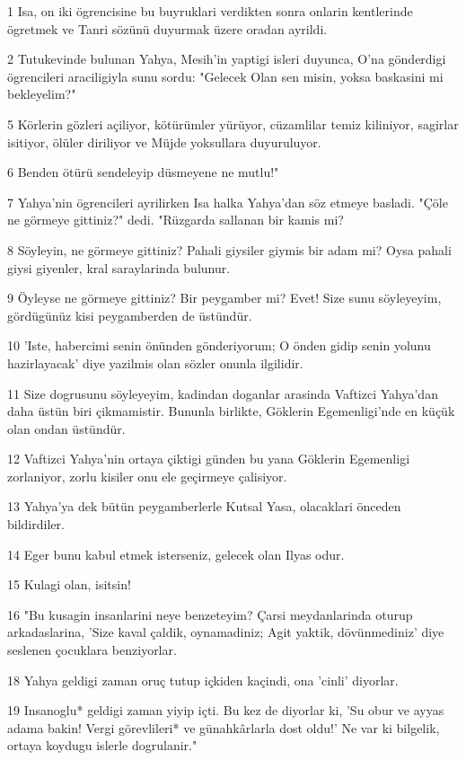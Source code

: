 \par 1 Isa, on iki ögrencisine bu buyruklari verdikten sonra onlarin kentlerinde ögretmek ve Tanri sözünü duyurmak üzere oradan ayrildi.
\par 2 Tutukevinde bulunan Yahya, Mesih'in yaptigi isleri duyunca, O'na gönderdigi ögrencileri araciligiyla sunu sordu: "Gelecek Olan sen misin, yoksa baskasini mi bekleyelim?"
\par 5 Körlerin gözleri açiliyor, kötürümler yürüyor, cüzamlilar temiz kiliniyor, sagirlar isitiyor, ölüler diriliyor ve Müjde yoksullara duyuruluyor.
\par 6 Benden ötürü sendeleyip düsmeyene ne mutlu!"
\par 7 Yahya'nin ögrencileri ayrilirken Isa halka Yahya'dan söz etmeye basladi. "Çöle ne görmeye gittiniz?" dedi. "Rüzgarda sallanan bir kamis mi?
\par 8 Söyleyin, ne görmeye gittiniz? Pahali giysiler giymis bir adam mi? Oysa pahali giysi giyenler, kral saraylarinda bulunur.
\par 9 Öyleyse ne görmeye gittiniz? Bir peygamber mi? Evet! Size sunu söyleyeyim, gördügünüz kisi peygamberden de üstündür.
\par 10 'Iste, habercimi senin önünden gönderiyorum; O önden gidip senin yolunu hazirlayacak' diye yazilmis olan sözler onunla ilgilidir.
\par 11 Size dogrusunu söyleyeyim, kadindan doganlar arasinda Vaftizci Yahya'dan daha üstün biri çikmamistir. Bununla birlikte, Göklerin Egemenligi'nde en küçük olan ondan üstündür.
\par 12 Vaftizci Yahya'nin ortaya çiktigi günden bu yana Göklerin Egemenligi zorlaniyor, zorlu kisiler onu ele geçirmeye çalisiyor.
\par 13 Yahya'ya dek bütün peygamberlerle Kutsal Yasa, olacaklari önceden bildirdiler.
\par 14 Eger bunu kabul etmek isterseniz, gelecek olan Ilyas odur.
\par 15 Kulagi olan, isitsin!
\par 16 "Bu kusagin insanlarini neye benzeteyim? Çarsi meydanlarinda oturup arkadaslarina, 'Size kaval çaldik, oynamadiniz; Agit yaktik, dövünmediniz' diye seslenen çocuklara benziyorlar.
\par 18 Yahya geldigi zaman oruç tutup içkiden kaçindi, ona 'cinli' diyorlar.
\par 19 Insanoglu* geldigi zaman yiyip içti. Bu kez de diyorlar ki, 'Su obur ve ayyas adama bakin! Vergi görevlileri* ve günahkârlarla dost oldu!' Ne var ki bilgelik, ortaya koydugu islerle dogrulanir."
